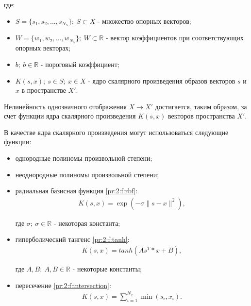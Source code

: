 где:

\begin{itemize}
			
	\item $S = \{s_1, s_2, ..., s_{N_S}\} ;~ S \subset X$ - множество опорных векторов;
	\item $W = \{w_1, w_2, ..., w_{N_S}\} ;~ W \subset \mathbb{R}$ - вектор коэффициентов при соответствующих опорных векторах;
	\item $b ;~ b \in \mathbb{R}$ - пороговый коэффициент;
	\item $K(s, x) ;~ s \in S ;~ x \in X$ - ядро скалярного произведения образов векторов $s$ и $x$ в пространстве $X'$.

\end{itemize}

Нелинейность однозначного отображения $X \to X'$ достигается, таким образом, за счет функции ядра скалярного произведения $K(s, x)$ векторов пространства $X'$.

В качестве ядра скалярного произведения могут использоваться следующие функции:

\begin{itemize}

	\item однородные полиномы произвольной степени;
	\item неоднородные полиномы произвольной степени;
	\item радиальная базисная функция \eqref{pr:2:f:rbf}:
\begin{gather}
	\label{pr:2:f:rbf}K(s, x) = \exp(-\sigma\|s - x\|^2),
\end{gather}

	где $\sigma ;~ \sigma \in \mathbb{R}$ - некоторая константа;

	\item гиперболический тангенс \eqref{pr:2:f:tanh}:
\begin{gather}
	\label{pr:2:f:tanh} K(s, x) = tanh \left ( A s^T * x + B \right ),
\end{gather}

	где $A, B ;~ A, B \in \mathbb{R}$ - некоторые константы;

	\item пересечение \eqref{pr:2:f:intersection}:
\begin{gather}
	\label{pr:2:f:intersection} K(s, x) = \sum_{i = 1}^{N_x} \min(s_i, x_i).
\end{gather}

\end{itemize}

